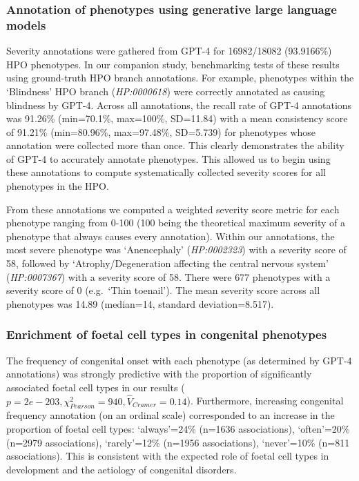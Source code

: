 \documentclass[
sn-nature
]{sn-jnl}
\begin{document}
\subsubsection{Annotation of phenotypes using generative large language
models}\label{annotation-of-phenotypes-using-generative-large-language-models}

Severity annotations were gathered from GPT-4 for 16982/18082
(93.9166\%) HPO phenotypes. In our companion study, benchmarking tests
of these results using ground-truth HPO branch annotations. For example,
phenotypes within the `Blindness' HPO branch (\emph{HP:0000618}) were
correctly annotated as causing blindness by GPT-4. Across all
annotations, the recall rate of GPT-4 annotations was 91.26\%
(min=70.1\%, max=100\%, SD=11.84) with a mean consistency score of
91.21\% (min=80.96\%, max=97.48\%, SD=5.739) for phenotypes whose
annotation were collected more than once. This clearly demonstrates the
ability of GPT-4 to accurately annotate phenotypes. This allowed us to
begin using these annotations to compute systematically collected
severity scores for all phenotypes in the HPO.

From these annotations we computed a weighted severity score metric for
each phenotype ranging from 0-100 (100 being the theoretical maximum
severity of a phenotype that always causes every annotation). Within our
annotations, the most severe phenotype was `Anencephaly'
(\emph{HP:0002323}) with a severity score of 58, followed by
`Atrophy/Degeneration affecting the central nervous system'
(\emph{HP:0007367}) with a severity score of 58. There were 677
phenotypes with a severity score of 0 (e.g.~`Thin toenail'). The mean
severity score across all phenotypes was 14.89 (median=14, standard
deviation=8.517).

\subsubsection{Enrichment of foetal cell types in congenital
phenotypes}\label{enrichment-of-foetal-cell-types-in-congenital-phenotypes}

The frequency of congenital onset with each phenotype (as determined by
GPT-4 annotations) was strongly predictive with the proportion of
significantly associated foetal cell types in our results
(\(p=2e-203,\chi^2_{Pearson}=940,\hat{V}_{Cramer}=0.14\)). Furthermore,
increasing congenital frequency annotation (on an ordinal scale)
corresponded to an increase in the proportion of foetal cell types:
`always'=24\% (n=1636 associations), `often'=20\% (n=2979 associations),
`rarely'=12\% (n=1956 associations), `never'=10\% (n=811 associations).
This is consistent with the expected role of foetal cell types in
development and the aetiology of congenital disorders.
\end{document}
